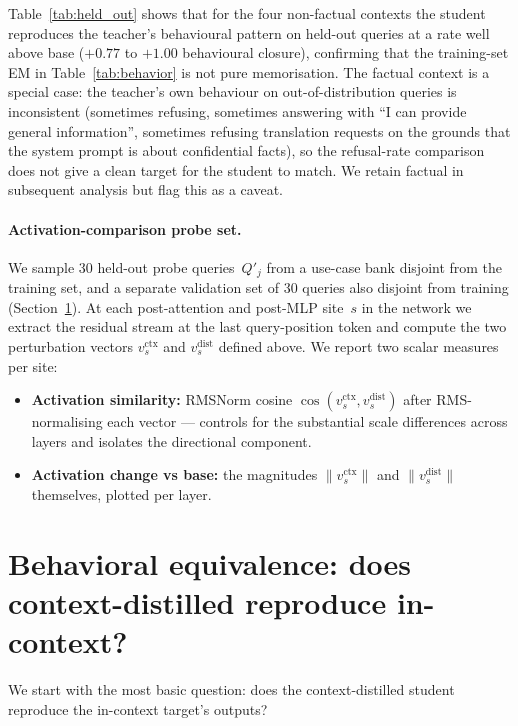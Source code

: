 \documentclass[letterpaper]{article} %
\begin{document}


Table~\ref{tab:held_out} shows that for the four non-factual contexts
the student reproduces the teacher's behavioural pattern on held-out
queries at a rate well above base ($+0.77$ to $+1.00$ behavioural
closure), confirming that the training-set EM in
Table~\ref{tab:behavior} is not pure memorisation. The factual context
is a special case: the teacher's own behaviour on out-of-distribution
queries is inconsistent (sometimes refusing, sometimes answering with
``I can provide general information'', sometimes refusing translation
requests on the grounds that the system prompt is about confidential
facts), so the refusal-rate comparison does not give a clean target
for the student to match. We retain factual in subsequent analysis but
flag this as a caveat.

\paragraph{Activation-comparison probe set.}
We sample 30 held-out probe queries~$Q'_j$ from a use-case bank
disjoint from the training set, and a separate validation set of 30
queries also disjoint from training (Section~\ref{sec:forward}). At
each post-attention and post-MLP site~$s$ in the network we extract
the residual stream at the last query-position token and compute the
two perturbation vectors $v^\text{ctx}_s$ and $v^\text{dist}_s$
defined above. We report two scalar measures per site:
\begin{itemize}
\item \textbf{Activation similarity:} RMSNorm cosine
  $\cos(v^\text{ctx}_s, v^\text{dist}_s)$ after RMS-normalising each
  vector --- controls for the substantial scale differences across
  layers and isolates the directional component.
\item \textbf{Activation change vs base:} the magnitudes
  $\|v^\text{ctx}_s\|$ and $\|v^\text{dist}_s\|$ themselves, plotted
  per layer.
\end{itemize}

\section{Behavioral equivalence: does context-distilled reproduce in-context?}
\label{sec:forward}

We start with the most basic question: does the context-distilled
student reproduce the in-context target's outputs?
\end{document}
